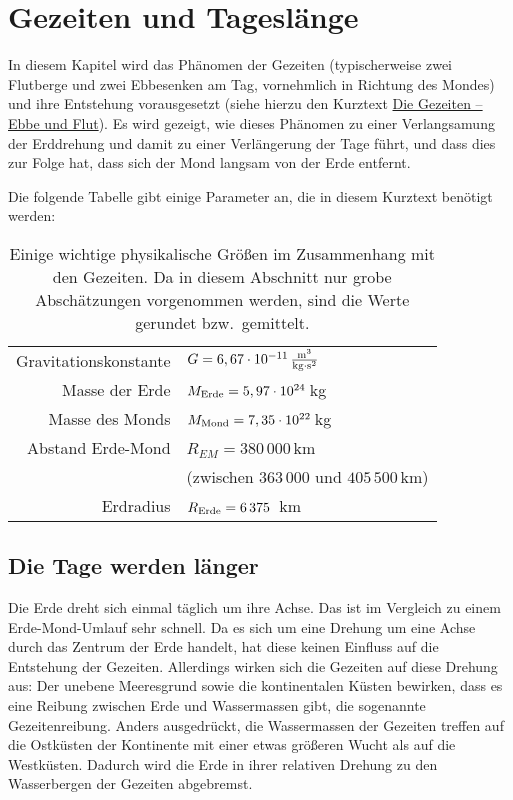 
\chapter{Gezeiten und Tagesl\"ange}
\label{chap_Gezeiten2}
 
In diesem Kapitel wird das Ph\"anomen der Gezeiten (typischerweise zwei Flutberge
und zwei Ebbesenken am Tag, vornehmlich in Richtung des Mondes) und ihre
Entstehung vorausgesetzt (siehe hierzu den Kurztext \glqq\hyperref[chap_Gezeiten1]{Die Gezeiten -- Ebbe und Flut}\grqq). 
Es wird gezeigt, wie dieses Ph\"anomen zu einer Verlangsamung
der Erddrehung und damit zu einer Verl\"angerung der Tage f\"uhrt, und dass dies
zur Folge hat, dass sich der Mond langsam von der Erde entfernt. 

Die folgende Tabelle gibt einige Parameter an, die in diesem Kurztext ben\"otigt werden: 
\begin{table}[htb]
\begin{tabular}{r|l}
Gravitationskonstante & $G= 6,67 \cdot 10^{-11}\,{\rm \frac{m^3}{kg\cdot s^2}}$  \\  
Masse der Erde & $M_{\rm Erde} = 5,97\cdot 10^{24}$\,kg  \\ 
Masse des Monds &  $ M_{\rm Mond} =7,35 \cdot 10^{22}$\,kg  \\
Abstand Erde-Mond &  $R_{EM} = 380\,000$\,km  \\[-0.2cm] 
 & (zwischen $363\,000$ und $405\,500$\,km) \\
Erdradius &   $R_{\rm Erde} =  6\,375$\, km \\
\end{tabular}
\caption{\label{tab_Tide2}%
Einige wichtige physikalische Gr\"o\ss en im Zusammenhang mit den Gezeiten.
Da in diesem Abschnitt nur grobe Absch\"atzungen vorgenommen werden, sind die 
Werte gerundet bzw.\ gemittelt.}
\end{table}
%

\section{Die Tage werden l\"anger}
\label{sec_EMWW}

Die Erde dreht sich einmal t\"aglich um ihre Achse. Das ist im Vergleich zu einem
Erde-Mond-Umlauf sehr schnell. Da es sich um eine Drehung um eine Achse durch
das Zentrum der Erde handelt, hat diese keinen Einfluss auf die Entstehung der Gezeiten. 
Allerdings wirken sich die Gezeiten auf diese Drehung aus: Der unebene Meeresgrund
sowie die kontinentalen K\"usten bewirken, dass es eine Reibung zwischen Erde und
Wassermassen gibt, die sogenannte Gezeitenreibung. 
Anders ausgedr\"uckt, die Wassermassen der Gezeiten treffen
auf die Ostk\"usten der Kontinente mit einer etwas gr\"o\ss eren Wucht als auf die
Westk\"usten. Dadurch wird die Erde in ihrer relativen Drehung zu den Wasserbergen
der Gezeiten abgebremst. 

